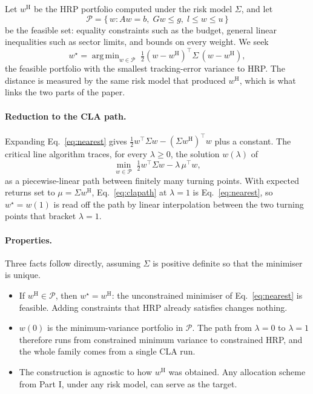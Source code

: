 \documentclass[11pt,a4paper]{article}
\newcounter{algo}
\DeclareMathOperator*{\argmin}{arg\,min}
\begin{document}
Let $w^{\mathrm{H}}$ be the HRP portfolio computed under the risk model
$\Sigma$, and let
\begin{equation}
  \mathcal{P} = \{\, w : A w = b,\; G w \le g,\; l \le w \le u \,\}
\end{equation}
be the feasible set: equality constraints such as the budget, general linear
inequalities such as sector limits, and bounds on every weight. We seek
\begin{equation}
  w^{\star} = \argmin_{w \in \mathcal{P}} \;
  \tfrac12 (w - w^{\mathrm{H}})^{\top} \Sigma \, (w - w^{\mathrm{H}}),
  \label{eq:nearest}
\end{equation}
the feasible portfolio with the smallest tracking-error variance to HRP.
The distance is measured by the same risk model that produced $w^{\mathrm{H}}$,
which is what links the two parts of the paper.

\paragraph{Reduction to the CLA path.}
Expanding Eq.~\eqref{eq:nearest} gives
$\tfrac12 w^{\top} \Sigma w - (\Sigma w^{\mathrm{H}})^{\top} w$ plus a constant.
The critical line algorithm \citep{schmelzer2026cla} traces, for every
$\lambda \ge 0$, the solution
$w(\lambda)$ of
\begin{equation}
  \min_{w \in \mathcal{P}} \; \tfrac12 w^{\top} \Sigma w - \lambda \, \mu^{\top} w,
  \label{eq:clapath}
\end{equation}
as a piecewise-linear path between finitely many turning points. With expected
returns set to $\mu = \Sigma w^{\mathrm{H}}$, Eq.~\eqref{eq:clapath} at
$\lambda = 1$ is Eq.~\eqref{eq:nearest}, so $w^{\star} = w(1)$ is read off the
path by linear interpolation between the two turning points that bracket
$\lambda = 1$.

\paragraph{Properties.}
Three facts follow directly, assuming $\Sigma$ is positive definite so that the
minimiser is unique.
\begin{itemize}
  \item If $w^{\mathrm{H}} \in \mathcal{P}$, then $w^{\star} = w^{\mathrm{H}}$:
        the unconstrained minimiser of Eq.~\eqref{eq:nearest} is feasible. Adding
        constraints that HRP already satisfies changes nothing.
  \item $w(0)$ is the minimum-variance portfolio in $\mathcal{P}$. The path from
        $\lambda = 0$ to $\lambda = 1$ therefore runs from constrained minimum
        variance to constrained HRP, and the whole family comes from a single
        CLA run.
  \item The construction is agnostic to how $w^{\mathrm{H}}$ was obtained. Any
        allocation scheme from Part I, under any risk model, can serve as the
        target.
\end{itemize}
\end{document}
